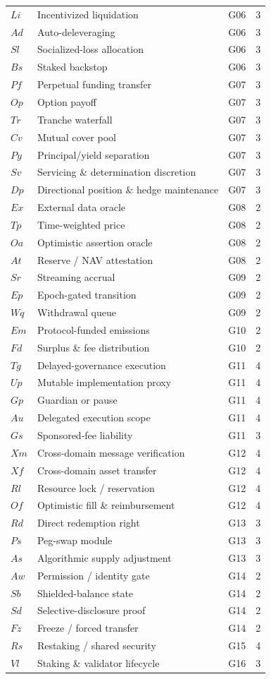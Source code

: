 \begin{longtable}{llll}
$Li$ & Incentivized liquidation & G06 & 3\\
$Ad$ & Auto-deleveraging & G06 & 3\\
$Sl$ & Socialized-loss allocation & G06 & 3\\
$Bs$ & Staked backstop & G06 & 3\\
$Pf$ & Perpetual funding transfer & G07 & 3\\
$Op$ & Option payoff & G07 & 3\\
$Tr$ & Tranche waterfall & G07 & 3\\
$Cv$ & Mutual cover pool & G07 & 3\\
$Py$ & Principal/yield separation & G07 & 3\\
$Sv$ & Servicing \& determination discretion & G07 & 3\\
$Dp$ & Directional position \& hedge maintenance & G07 & 3\\
$Ex$ & External data oracle & G08 & 2\\
$Tp$ & Time-weighted price & G08 & 2\\
$Oa$ & Optimistic assertion oracle & G08 & 2\\
$At$ & Reserve / NAV attestation & G08 & 2\\
$Sr$ & Streaming accrual & G09 & 2\\
$Ep$ & Epoch-gated transition & G09 & 2\\
$Wq$ & Withdrawal queue & G09 & 2\\
$Em$ & Protocol-funded emissions & G10 & 2\\
$Fd$ & Surplus \& fee distribution & G10 & 2\\
$Tg$ & Delayed-governance execution & G11 & 4\\
$Up$ & Mutable implementation proxy & G11 & 4\\
$Gp$ & Guardian or pause & G11 & 4\\
$Au$ & Delegated execution scope & G11 & 4\\
$Gs$ & Sponsored-fee liability & G11 & 3\\
$Xm$ & Cross-domain message verification & G12 & 4\\
$Xf$ & Cross-domain asset transfer & G12 & 4\\
$Rl$ & Resource lock / reservation & G12 & 4\\
$Of$ & Optimistic fill \& reimbursement & G12 & 4\\
$Rd$ & Direct redemption right & G13 & 3\\
$Ps$ & Peg-swap module & G13 & 3\\
$As$ & Algorithmic supply adjustment & G13 & 3\\
$Aw$ & Permission / identity gate & G14 & 2\\
$Sb$ & Shielded-balance state & G14 & 2\\
$Sd$ & Selective-disclosure proof & G14 & 2\\
$Fz$ & Freeze / forced transfer & G14 & 2\\
$Rs$ & Restaking / shared security & G15 & 4\\
$Vl$ & Staking \& validator lifecycle & G16 & 3\\
\bottomrule
\end{longtable}

